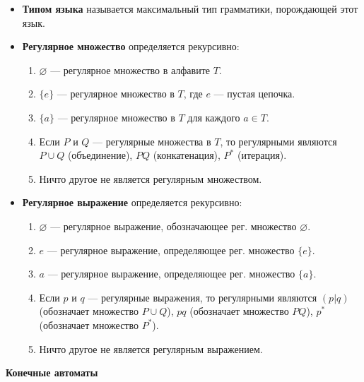 \begin{itemize}
    \item \textbf{Типом языка} называется максимальный тип грамматики, порождающей этот язык.
    \item \textbf{Регулярное множество} определяется рекурсивно:
    \begin{enumerate}
        \item $\varnothing$ --- регулярное множество в алфавите $T$.
        \item $\{e\}$ --- регулярное множество в $T$, где $e$ --- пустая цепочка.
        \item $\{a\}$ --- регулярное множество в $T$ для каждого $a \in T$.
        \item Если $P$ и $Q$ --- регулярные множества в $T$, то регулярными являются $P \cup Q$ (объединение), $P Q$ (конкатенация), $P^\ast$ (итерация).
        \item Ничто другое не является регулярным множеством.
    \end{enumerate}
    \item \textbf{Регулярное выражение} определяется рекурсивно:
    \begin{enumerate}
        \item $\varnothing$ --- регулярное выражение, обозначающее рег. множество $\varnothing$.
        \item $e$ --- регулярное выражение, определяющее рег. множество $\{e\}$.
        \item $a$ --- регулярное выражение, определяющее рег. множество $\{a\}$.
        \item Если $p$ и $q$ --- регулярные выражения, то регулярными являются $(p | q)$ (обозначает множество $P \cup Q$), $p q$ (обозначает множество $P Q$), $p^\ast$ (обозначает множество $P^\ast$).
        \item Ничто другое не является регулярным выражением.
    \end{enumerate}
\end{itemize}

\textbf{Конечные автоматы}

